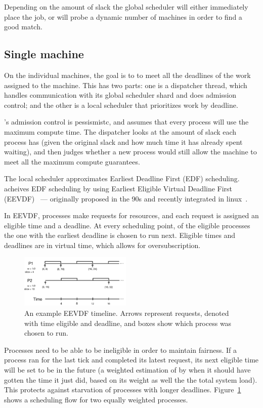 Depending on the amount of slack the global scheduler will either immediately
place the job, or will probe a dynamic number of machines in order to find a
good match.


\subsection*{Single machine}

On the individual machines, the goal is to to meet all the deadlines of the work
assigned to the machine. This has two parts: one is a dispatcher thread, which
handles communication with its global scheduler shard and does admission
control; and the other is a local scheduler that prioritizes work by deadline.

\sysname{}'s admission control is pessismistc, and assumes that every process will use the
maximum compute time. The dispatcher looks at the amount of slack each process
has (given the original slack and how much time it has already spent waiting),
and then judges whether a new process would still allow the machine to meet all
the maximum compute guarantees.


The local scheduler approximates Earliest Deadline First (EDF) scheduling.
\sysname{} acheives EDF scheduling by using Earliest Eligible Virtual Deadline
First (EEVDF)~\cite{eevdf} --- originally proposed in the 90s and recently
integrated in linux~\cite{linuxeevdf}.

In EEVDF, processes make requests for resources, and each request is assigned an
eligible time and a deadline. At every scheduling point, of the eligible
processes the one with the earliest deadline is chosen to run next. Eligible
times and deadlines are in virtual time, which allows for oversubscription. 

\begin{figure}[t!]
    \centering
    \includegraphics[height=1in]{img/eevdf.png}
    \caption{An example EEVDF timeline. Arrows represent requests, denoted with
        time eligible and deadline, and boxes show which process was chosen to
        run.}
    \label{fig:eevdf}
\end{figure}

Processes need to be able to be ineligible in order to maintain fairness. If a
process ran for the last tick and completed its latest request, its next
eligible time will be set to be in the future (a weighted estimation of by when
it should have gotten the time it just did, based on its weight as well the the
total system load). This protects against starvation of processes with longer
deadlines. Figure~\ref{fig:eevdf} shows a scheduling flow for two equally weighted
processes.

